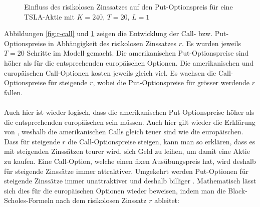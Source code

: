 \documentclass[11pt]{report} %
\begin{document}
\begin{figure}[H]
    \centering
    \caption{Einfluss des risikolosen Zinssatzes auf den Put-Optionspreis für eine TSLA-Aktie mit $K=240$, $T=20$, $L=1$}
    \label{fig:r-put}
\end{figure}
Abbildungen \ref{fig:r-call} und \ref{fig:r-put} zeigen die Entwicklung der Call- bzw. Put-Optionspreise in Abhängigkeit des risikolosen Zinssatzes $r$. Es wurden jeweils $T=20$ Schritte im Modell gemacht. Die amerikanischen Put-Optionspreise sind höher als für die entsprechenden europäischen Optionen. Die amerikanischen und europäischen Call-Optionen kosten jeweils gleich viel. Es wachsen die Call-Optionspreise für steigende $r$, wobei die Put-Optionspreise für grösser werdende $r$ fallen.\\\\
Auch hier ist wieder logisch, dass die amerikanischen Put-Optionspreise höher als die entsprechenden europäischen sein müssen. Auch hier gilt wieder die Erklärung von \textcite{Adelmeyer2003}, weshalb die amerikanischen Calls gleich teuer sind wie die europäischen. Dass für steigende $r$ die Call-Optionspreise steigen, kann man so erklären, dass es mit steigenden Zinssätzen teurer wird, sich Geld zu leihen, um damit eine Aktie zu kaufen. Eine Call-Option, welche einen fixen Ausübungspreis hat, wird deshalb für steigende Zinssätze immer attraktiver. Umgekehrt werden Put-Optionen für steigende Zinssätze immer unattraktiver und deshalb billiger \parencite{zeng2023}. Mathematisch lässt sich dies für die europäischen Optionen wieder beweisen, indem man die Black-Scholes-Formeln nach dem risikolosen Zinssatz $r$ ableitet:
\end{document}
